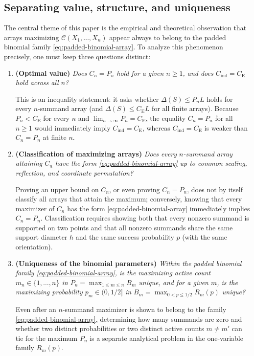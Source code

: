 \documentclass[11pt]{article}
\numberwithin{equation}{section}
\theoremstyle{definition}
\theoremstyle{remark}
\newcommand{\ce}{C_{\mathrm E}}
\newcommand{\Cind}{C_{\mathrm{ind}}}
\begin{document}
\subsection{Separating value, structure, and uniqueness}

The central theme of this paper is the empirical and theoretical observation
that arrays maximizing $\mathcal C(X_1,\ldots,X_n)$ appear always to belong
to the padded binomial family \eqref{eq:padded-binomial-array}. To analyze
this phenomenon precisely, one must keep three questions distinct:

\begin{enumerate}[label=\textbf{Question \arabic*.},ref=\arabic*,leftmargin=6.5em]
\item\label{q:value} \textbf{(Optimal value)}
\emph{Does $C_n=P_n$ hold for a given $n\ge1$, and does $\Cind=\ce$ hold
across all $n$?}

This is an inequality statement: it asks whether $\Delta(S)\le P_n L$ holds
for every $n$-summand array (and $\Delta(S)\le\ce L$ for all finite arrays).
Because $P_n<\ce$ for every $n$ and $\lim_{n\to\infty}P_n=\ce$, the equality
$C_n=P_n$ for all $n\ge1$ would immediately imply $\Cind=\ce$, whereas
$\Cind=\ce$ is weaker than $C_n=P_n$ at finite $n$.

\item\label{q:structure} \textbf{(Classification of maximizing arrays)}
\emph{Does every $n$-summand array attaining $C_n$ have the form
\eqref{eq:padded-binomial-array} up to common scaling, reflection, and
coordinate permutation?}

Proving an upper bound on $C_n$, or even proving $C_n=P_n$, does not by
itself classify all arrays that attain the maximum; conversely, knowing that
every maximizer of $C_n$ has the form \eqref{eq:padded-binomial-array}
immediately implies $C_n=P_n$. Classification requires showing both that
every nonzero summand is supported on two points and that all nonzero
summands share the same support diameter $h$ and the same success probability
$p$ (with the same orientation).

\item\label{q:uniqueness} \textbf{(Uniqueness of the binomial parameters)}
\emph{Within the padded binomial family \eqref{eq:padded-binomial-array}, is
the maximizing active count $m_n\in\{1,\ldots,n\}$ in
$P_n=\max_{1\le m\le n}B_m$ unique, and for a given $m$, is the maximizing
probability $p_m\in(0,1/2]$ in $B_m=\max_{0<p\le1/2}R_m(p)$ unique?}

Even after an $n$-summand maximizer is shown to belong to the family
\eqref{eq:padded-binomial-array}, determining how many summands are zero and
whether two distinct probabilities or two distinct active counts $m\ne m'$
can tie for the maximum $P_n$ is a separate analytical problem in the
one-variable family $R_m(p)$.
\end{enumerate}
\end{document}
